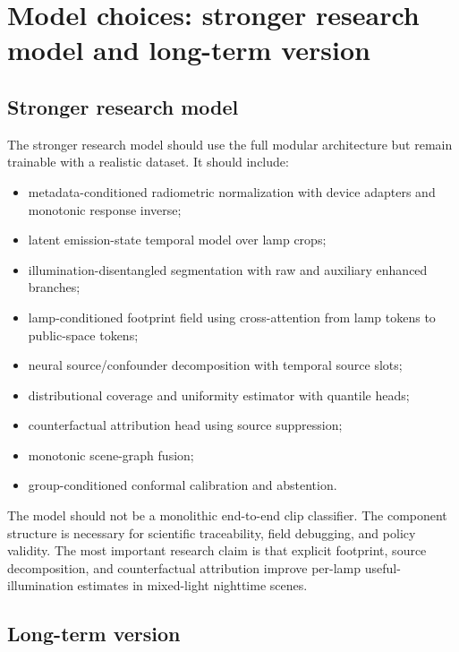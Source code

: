 \documentclass[11pt]{article}
\begin{document}
\section{Model choices: stronger research model and long-term version}

\subsection{Stronger research model}

The stronger research model should use the full modular architecture but remain trainable with a realistic dataset. It should include:
\begin{itemize}
  \item metadata-conditioned radiometric normalization with device adapters and monotonic response inverse;
  \item latent emission-state temporal model over lamp crops;
  \item illumination-disentangled segmentation with raw and auxiliary enhanced branches;
  \item lamp-conditioned footprint field using cross-attention from lamp tokens to public-space tokens;
  \item neural source/confounder decomposition with temporal source slots;
  \item distributional coverage and uniformity estimator with quantile heads;
  \item counterfactual attribution head using source suppression;
  \item monotonic scene-graph fusion;
  \item group-conditioned conformal calibration and abstention.
\end{itemize}

The model should not be a monolithic end-to-end clip classifier. The component structure is necessary for scientific traceability, field debugging, and policy validity. The most important research claim is that explicit footprint, source decomposition, and counterfactual attribution improve per-lamp useful-illumination estimates in mixed-light nighttime scenes.

\subsection{Long-term version}
\end{document}
